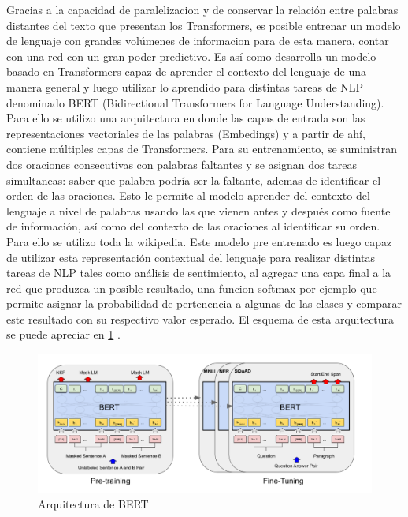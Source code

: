 Gracias a la capacidad de paralelizacion y de conservar la relación entre palabras distantes del texto que presentan los Transformers, es posible entrenar un modelo de lenguaje con grandes volúmenes de informacion para de esta manera, contar con una red con un gran poder predictivo. Es así como\cite{devlin2018bert}  desarrolla un modelo basado en Transformers capaz de aprender el contexto del lenguaje de una manera general y luego utilizar lo aprendido para distintas tareas de NLP denominado BERT (Bidirectional Transformers for Language Understanding). Para ello se utilizo una arquitectura en donde las capas de entrada son las representaciones vectoriales de las palabras (Embedings) y a partir de ahí, contiene múltiples capas de Transformers. Para su entrenamiento, se suministran dos oraciones consecutivas con palabras faltantes y se asignan dos tareas simultaneas: saber que palabra podría ser la faltante, ademas de identificar el orden de las oraciones. Esto le permite al modelo aprender del contexto del lenguaje a nivel de palabras usando las que vienen antes y después como fuente de información, así como del contexto de las oraciones al identificar su orden. Para ello se utilizo toda la wikipedia. Este modelo pre entrenado es luego capaz de utilizar esta representación contextual del lenguaje para realizar distintas tareas de NLP tales como análisis de sentimiento, al agregar una capa final a la red que produzca un posible resultado, una funcion softmax por ejemplo que permite asignar la probabilidad de pertenencia a algunas de las clases y comparar este resultado con su respectivo valor esperado. El esquema de esta arquitectura se puede apreciar en \ref{figure:BERT} \cite{devlin2018bert}.

\begin{figure}[t]
	\centering
	\includegraphics[scale=0.35]{Images & Logos/BERT.png} 
	\caption{Arquitectura de BERT}
	\label{figure:BERT}
\end{figure}



